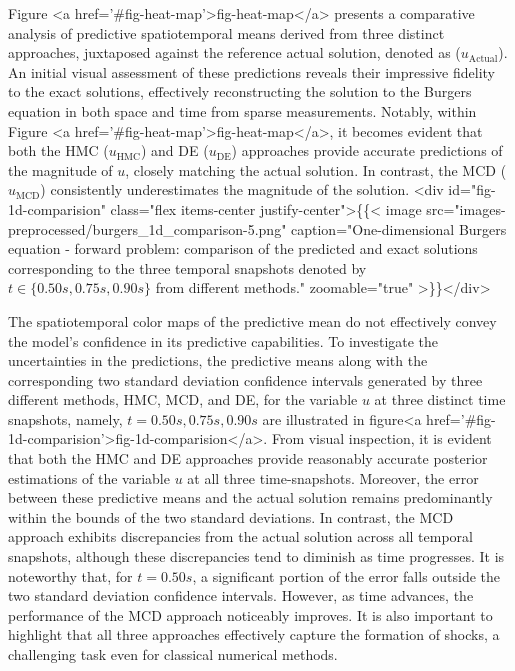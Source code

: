 \documentclass{article}
\begin{document}
Figure <a href='#fig-heat-map'>fig-heat-map</a> presents a comparative analysis of predictive spatiotemporal means derived from three distinct approaches, juxtaposed against the reference actual solution, denoted as ($u_{\mathrm{Actual}}$).
An initial visual assessment of these predictions reveals their impressive fidelity to the exact solutions, effectively reconstructing the solution to the Burgers equation in both space and time from sparse measurements.
Notably, within Figure <a href='#fig-heat-map'>fig-heat-map</a>, it becomes evident that both the HMC ($u_{\mathrm{HMC}}$) and DE ($u_{\mathrm{DE}}$) approaches provide accurate predictions of the magnitude of $u$, closely matching the actual solution. In contrast, the MCD ($u_{\mathrm{MCD}}$) consistently underestimates the magnitude of the solution.
<div id="fig-1d-comparision" class="flex items-center justify-center">\{\{< image src="images-preprocessed/burgers_1d_comparison-5.png" caption="One-dimensional Burgers equation - forward problem: comparison of the predicted and exact solutions corresponding to the three temporal snapshots denoted by $t \in \{0.50s, 0.75s, 0.90s\}$ from different methods." zoomable="true" >\}\}</div>


The spatiotemporal color maps of the predictive mean do not effectively convey the model's confidence in its predictive capabilities.
To investigate the uncertainties in the predictions, the predictive means along with the corresponding two standard deviation confidence intervals generated by three different methods, HMC, MCD, and DE, for the variable $u$ at three distinct time snapshots, namely, $t = 0.50s, 0.75s, 0.90s$ are illustrated in figure<a href='#fig-1d-comparision'>fig-1d-comparision</a>.
From visual inspection, it is evident that both the HMC and DE approaches provide reasonably accurate posterior estimations of the variable $u$ at all three time-snapshots. 
Moreover, the error between these predictive means and the actual solution remains predominantly within the bounds of the two standard deviations.
In contrast, the MCD approach exhibits discrepancies from the actual solution across all temporal snapshots, although these discrepancies tend to diminish as time progresses. 
It is noteworthy that, for $t = 0.50s$, a significant portion of the error falls outside the two standard deviation confidence intervals.
However, as time advances, the performance of the MCD approach noticeably improves. It is also important to highlight that all three approaches effectively capture the formation of shocks, a challenging task even for classical numerical methods.
\end{document}
